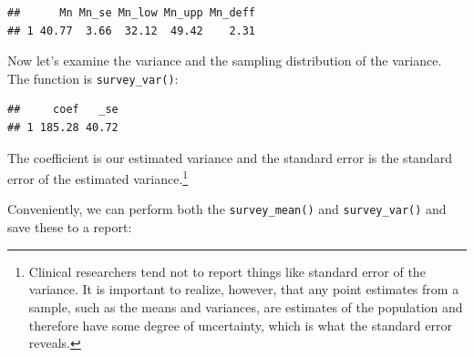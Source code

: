 \documentclass[
]{article}
\newenvironment{Shaded}{\begin{snugshade}}{\end{snugshade}}
\newcommand{\DataTypeTok}[1]{\textcolor[rgb]{0.13,0.29,0.53}{#1}}
\newcommand{\DecValTok}[1]{\textcolor[rgb]{0.00,0.00,0.81}{#1}}
\newcommand{\KeywordTok}[1]{\textcolor[rgb]{0.13,0.29,0.53}{\textbf{#1}}}
\newcommand{\NormalTok}[1]{#1}
\newcommand{\OperatorTok}[1]{\textcolor[rgb]{0.81,0.36,0.00}{\textbf{#1}}}
\newcommand{\OtherTok}[1]{\textcolor[rgb]{0.56,0.35,0.01}{#1}}
\newcommand{\StringTok}[1]{\textcolor[rgb]{0.31,0.60,0.02}{#1}}
\begin{document}
\begin{verbatim}
##      Mn Mn_se Mn_low Mn_upp Mn_deff
## 1 40.77  3.66  32.12  49.42    2.31
\end{verbatim}

Now let's examine the variance and the sampling distribution of the variance.
The function is \texttt{survey\_var()}:

\begin{Shaded}
\end{Shaded}

\begin{verbatim}
##     coef   _se
## 1 185.28 40.72
\end{verbatim}

The coefficient is our estimated variance and the standard error is the standard error of the estimated variance.\footnote{Clinical researchers tend not to report things like standard error of the variance. It is important to realize, however, that any point estimates from a sample, such as the means and variances, are estimates of the population and therefore have some degree of uncertainty, which is what the standard error reveals.}

Conveniently, we can perform both the \texttt{survey\_mean()} and \texttt{survey\_var()} and save these to a report:

\begin{Shaded}
\end{Shaded}
\end{document}
